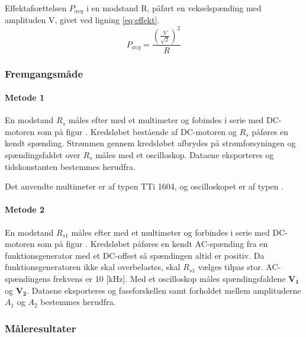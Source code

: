 Effektafsættelsen \(P_{avg}\) i en modstand R, påført en vekselspænding med amplituden V, givet ved ligning \ref{eq:effekt}.
\begin{equation}
	P_{avg}=\frac{\left(\frac{V}{\sqrt{2}}\right)^2}{R}
	\label{eq:effekt}
 \end{equation}
\subsubsection{Fremgangsmåde}
\paragraph{Metode 1}
En modstand \(R_s\) måles efter med et multimeter og fobindes i serie med DC-motoren
som på figur %
.
Kredsløbet bestående af DC-motoren og \(R_s\) påføres en kendt spænding.
Strømmen gennem kredsløbet afbrydes på strømforsyningen og spændingsfaldet
over \(R_s\) måles med et oscilloskop.
Dataene eksporteres og tidskonstanten bestemmes herudfra.

Det anvendte multimeter er af typen TTi 1604,
og oscilloskopet er af typen .

\paragraph{Metode 2}
En modstand \(R_{s1}\) måles efter med et multimeter og forbindes i serie med DC-motoren
som på figur %
.
Kredsløbet påføres en kendt AC-spænding fra en funktionsgenerator med et DC-offset så spændingen
altid er positiv.
Da funktionsgeneratoren ikke skal overbelastes, skal \(R_{s1}\) vælges tilpas stor.
AC-spændingens frekvens er 10 [kHz].
Med et oscilloskop måles spændingsfaldene \(\mathbf{V_1}\) og \(\mathbf{V_2}\).
Dataene eksporteres og faseforskellen samt forholdet mellem amplituderne \(A_1\) og \(A_2\) bestemmes herudfra.
\subsubsection{Måleresultater}
